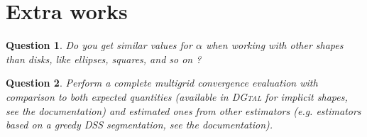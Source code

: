 \documentclass[a4paper, 11pt]{article}
\newtheorem{qu}{Question}
\begin{document}
\section{Extra works}

\begin{qu}
Do you get similar values for $\alpha$ when working with other shapes than disks, like ellipses, squares, and so on ?
\end{qu}

\begin{qu}
  Perform a complete multigrid convergence evaluation with comparison
  to both expected quantities (available in \textsc{DGtal} for
  implicit shapes, see the documentation) and estimated ones from other
  estimators (e.g. estimators based on a greedy DSS segmentation, see the 
 documentation).
\end{qu}
\end{document}
